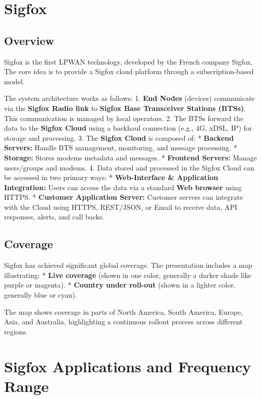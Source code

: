 \documentclass[a4paper, 12pt]{book} %
\begin{document}
\chapter{Sigfox}\label{sigfox}

\section{Overview}\label{overview}

Sigfox is the first LPWAN technology, developed by the French company
Sigfox. The core idea is to provide a Sigfox cloud platform through a
subscription-based model.

The system architecture works as follows: 1. \textbf{End Nodes}
(devices) communicate via the \textbf{Sigfox Radio link} to
\textbf{Sigfox Base Transceiver Stations (BTSs)}. This communication is
managed by local operators. 2. The BTSs forward the data to the
\textbf{Sigfox Cloud} using a backhaul connection (e.g., 4G, xDSL, IP)
for storage and processing. 3. The \textbf{Sigfox Cloud} is composed of:
* \textbf{Backend Servers:} Handle BTS management, monitoring, and
message processing. * \textbf{Storage:} Stores modems metadata and
messages. * \textbf{Frontend Servers:} Manage users/groups and modems.
4. Data stored and processed in the Sigfox Cloud can be accessed in two
primary ways: * \textbf{Web-Interface \& Application Integration:} Users
can access the data via a standard \textbf{Web browser} using HTTPS. *
\textbf{Customer Application Server:} Customer servers can integrate
with the Cloud using HTTPS, REST/JSON, or Email to receive data, API
responses, alerts, and call backs.

\section{Coverage}\label{coverage}

Sigfox has achieved significant global coverage. The presentation
includes a map illustrating: * \textbf{Live coverage} (shown in one
color, generally a darker shade like purple or magenta). *
\textbf{Country under roll-out} (shown in a lighter color, generally
blue or cyan).

The map shows coverage in parts of North America, South America, Europe,
Asia, and Australia, highlighting a continuous rollout process across
different regions.

\chapter{Sigfox Applications and Frequency
Range}\label{sigfox-applications-and-frequency-range}
\end{document}
